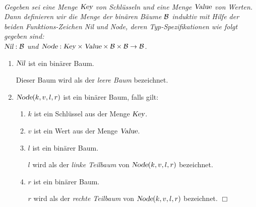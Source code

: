 \begin{Definition} \hspace*{\fill} \\
{\em
  Gegeben sei eine Menge $\textsl{Key}$ von Schl\"usseln und eine Menge $\textsl{Value}$ von
  Werten.  Dann definieren wir
  die Menge der bin\"aren B\"aume $\mathcal{B}$ induktiv mit Hilfe der
  beiden Funktions-Zeichen \textsl{Nil} und \textsl{Node}, deren Typ-Spezifikationen 
  wie folgt gegeben sind: \\[0.1cm]
  \hspace*{1.3cm} 
  $\textsl{Nil}: \mathcal{B}$ \qquad und \qquad  $\textsl{Node}: \textsl{Key} \times \textsl{Value} \times \mathcal{B} \times \mathcal{B} \rightarrow \mathcal{B}$.
  \begin{enumerate}
  \item $\textsl{Nil}$ ist ein bin\"arer Baum.

        Dieser Baum wird als der \emph{leere Baum} bezeichnet.
  \item $\textsl{Node}(k, v, l, r)$ ist ein bin\"arer Baum, falls gilt: 
        \begin{enumerate}
        \item $k$ ist ein Schl\"ussel aus der Menge $\textsl{Key}$.
        \item $v$ ist ein Wert aus der Menge $\textsl{Value}$.
        \item $l$ ist ein bin\"arer Baum.

              $l$ wird als der \emph{linke Teilbaum} von $\textsl{Node}(k, v, l, r)$ bezeichnet.
        \item $r$ ist ein bin\"arer Baum.

              $r$ wird als der \emph{rechte Teilbaum} von $\textsl{Node}(k, v, l, r)$ bezeichnet.
              \hspace*{\fill} $\Box$
        \end{enumerate}
  \end{enumerate}
}
\end{Definition}

